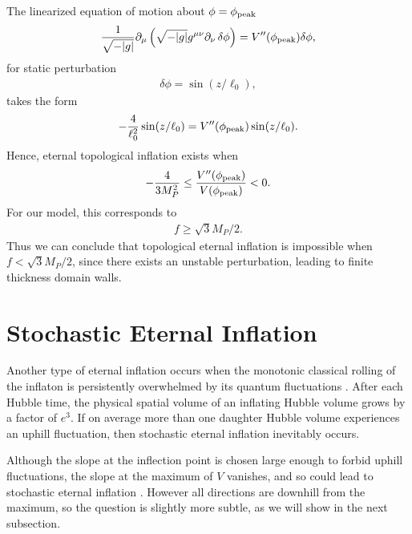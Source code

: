 \documentclass[aps,amsfonts,amsmath,prd,preprint,nofootinbib,superscriptaddress]{revtex4}
\newcommand{\Mp}{{M_{P}}}
\newcommand{\MMp}{{M_P^2}}
\begin{document}
\begin{appendix}
The linearized equation of motion about $\phi = \phi_{\rm peak}$
\begin{align}
\frac{1}{\sqrt{-|g|}}\partial_\mu\left(\sqrt{-|g|}g^{\mu\nu}\partial_\nu\, \delta\phi\right) = V''(\phi_{\rm peak}) \delta\phi,
\end{align}
for static perturbation 
\begin{align}
\delta\phi = \sin(z/\ell_0),
\end{align}
takes the form
\begin{align}
-\frac{4}{\ell_0^2}\sin(z/\ell_0) = V''(\phi_{\rm peak})\sin(z/\ell_0).
\end{align}
Hence, eternal topological inflation exists when
\begin{align}
 -\frac{4}{3\MMp} \leq \frac{V''(\phi_{\rm peak})}{V(\phi_{\rm peak})} < 0.
\end{align}
For our model, this corresponds to
\begin{align}
f \geq \sqrt{3}\Mp/2.
\end{align}
Thus we can conclude that topological eternal inflation is impossible when $f < \sqrt{3}\Mp/2$,
since there exists an unstable perturbation, leading to finite thickness domain walls.




\section{Stochastic Eternal Inflation}\label{sec:stoc}
Another type of eternal inflation occurs when the monotonic classical rolling of the inflaton is persistently overwhelmed by its quantum fluctuations \cite{steinhardt1982,Vilenkin:1983xq,Linde:1983gd}.  
After each Hubble time, the physical spatial volume of an inflating Hubble volume grows by a factor of $e^3$.  If on average more than one daughter Hubble volume
experiences an uphill fluctuation, then stochastic eternal inflation inevitably occurs.


Although the slope at the inflection point is chosen large enough to forbid uphill fluctuations, the slope at the maximum of $V$ vanishes, and so could lead to stochastic eternal inflation \cite{Barenboim:2016mmw}.  
However all directions are downhill from the maximum, so the question is slightly more subtle, as we will show in the next subsection.


\end{appendix}
\end{document}
